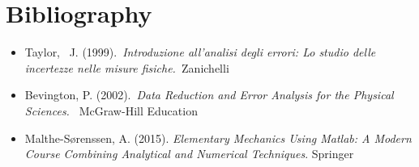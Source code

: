\documentclass[11pt,a4paper]{article}
\begin{document}
\section{Bibliography}
\begin{itemize}
\item
  Taylor,~ J. (1999).~\emph{Introduzione all'analisi degli errori: Lo
  studio delle incertezze nelle misure fisiche.~}Zanichelli
\item
  Bevington, P. (2002).~\emph{Data Reduction and Error Analysis for the
  Physical Sciences.~} McGraw-Hill Education ~
\item Malthe-Sørenssen, A. (2015). \emph{Elementary Mechanics Using Matlab: A Modern Course Combining Analytical and Numerical Techniques}. Springer
\end{itemize}
\end{document}
